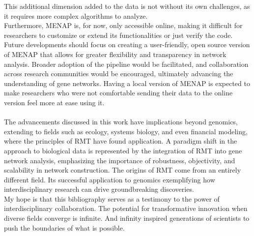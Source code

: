 This additional dimension added to the data is not without its own challenges, as it requires more complex algorithms to analyze.
\\
\noindent Furthermore, MENAP is, for now, only accessible online, making it difficult for researchers to customize or extend its functionalities or just verify the code.
Future developments should focus on creating a user-friendly, open source version of MENAP that allows for greater flexibility and transparency in network analysis.
Broader adoption of the pipeline would be facilitated, and collaboration across research communities would be encouraged, ultimately advancing the understanding of gene networks.
Having a local version of MENAP is expected to make researchers who were not comfortable sending their data to the online version feel more at ease using it.
\\\\
The advancements discussed in this work have implications beyond genomics, extending to fields such as ecology, systems biology, and even financial modeling, where the principles of RMT have found application.
A paradigm shift in the approach to biological data is represented by the integration of RMT into gene network analysis, emphasizing the importance of robustness, objectivity, and scalability in network construction.
The origins of RMT come from an entirely different field.
Its successful application to genomics exemplifying how interdisciplinary research can drive groundbreaking discoveries.
\\
\noindent My hope is that this bibliography serves as a testimony to the power of interdisciplinary collaboration.
The potential for transformative innovation when diverse fields converge is infinite.
And infinity inspired generations of scientists to push the boundaries of what is possible.
